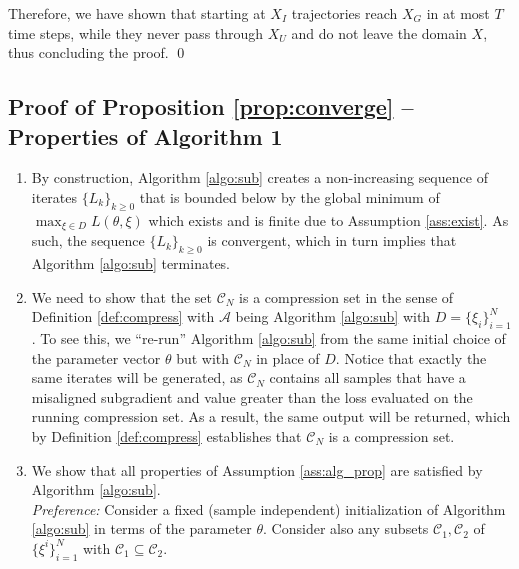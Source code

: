     Therefore, we have shown that starting at $X_I$ trajectories reach $X_G$ in at most $T$ time steps, while they never pass through $X_U$ and do not leave the domain $X$, thus concluding the proof. \qed

\subsection{Proof of Proposition \ref{prop:converge} -- Properties of Algorithm 1}
\begin{enumerate}[wide, labelwidth=!, labelindent=0pt]
\item By construction, Algorithm \ref{algo:sub} creates a non-increasing sequence of iterates $\{L_k\}_{k\geq 0}$ that is bounded below by the global minimum of $\max_{\xi \in D} L(\theta,\xi)$ which exists and is finite due to Assumption \ref{ass:exist}.
As such, the sequence $\{L_k\}_{k\geq 0}$ is convergent, which in turn implies that Algorithm \ref{algo:sub} terminates.\\
\item We need to show that the set $\mathcal{C}_N$ is a compression set in the sense of Definition \ref{def:compress} with $\mathcal{A}$ being Algorithm \ref{algo:sub} with $D = \{\xi_i\}_{i=1}^N$. 
To see this, we ``re-run'' Algorithm \ref{algo:sub} from the same initial choice of the parameter vector $\theta$ but with $\mathcal{C}_N$ in place of $D$. 
Notice that exactly the same iterates will be generated, as $\mathcal{C}_N$ contains all samples that have a misaligned subgradient and value greater than the loss evaluated on the running compression set. %
As a result, the same output will be returned, which by Definition \ref{def:compress} establishes that $\mathcal{C}_N$ is a compression set.\\
\item We show that all properties of Assumption \ref{ass:alg_prop} are satisfied by Algorithm \ref{algo:sub}. \\

\emph{Preference:} Consider a fixed (sample independent) initialization of Algorithm \ref{algo:sub} in terms of the parameter $\theta$. 
Consider also any subsets $\mathcal{C}_1,\mathcal{C}_2$ of 
$\{\xi^i\}_{i=1}^N$ with $\mathcal{C}_1\subseteq \mathcal{C}_2$. 


\end{enumerate}
